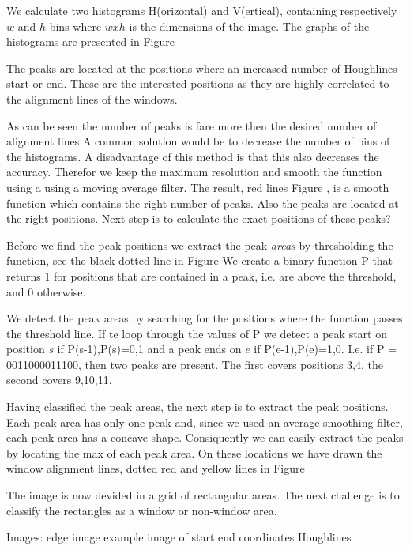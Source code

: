 We calculate two histograms H(orizontal) and V(ertical), containing respectively
$w$ and $h$ bins where $w x h$ is the dimensions of the image.  The graphs of
the histograms are presented in Figure %

The peaks are located at the positions where an increased number of Houghlines
start or end.  These are the interested positions as they are highly correlated
to the alignment lines of the windows. 

As can be seen the number of peaks is fare more then the desired number of alignment lines 
A common solution would be to decrease the number of bins of the histograms. A
disadvantage of this method is that this also decreases the accuracy. Therefor
we keep the maximum resolution and smooth the function using a using a moving
average filter.
The result, red lines Figure %
, is a smooth function which contains the right number of peaks. Also the peaks
are located at the right positions. Next step is to calculate the exact positions of these
peaks?

Before we find the peak positions we extract the peak \emph{areas} by thresholding the
function, see the black dotted line in Figure %
We create a binary function P that returns 1 for positions that are contained in
a peak, i.e. are above the threshold, and 0 otherwise.

We detect the peak areas by searching for the positions where the function
passes the threshold line. 
If te loop through the values of P we detect a peak start on position $s$ if {P(s-1),P(s)}={0,1}
and a peak ends on $e$ if {P(e-1),P(e)}={1,0}. 
I.e. if P = 0011000011100, then two peaks are present. The first covers positions {3,4}, 
the second covers {9,10,11}. 

Having classified the peak areas, the next step is to extract the peak positions. 
Each peak area has only one peak and, since we used an average smoothing filter, each
peak area has a concave shape. Consiquently we can easily extract the peaks
by locating the max of each peak area. 
On these locations we have drawn the window alignment lines, dotted red and yellow lines
in Figure %

The image is now devided in a grid of rectangular areas. The next challenge is to 
classify the rectangles as a window or non-window area.


Images:
edge image
example image of start end coordinates Houghlines


